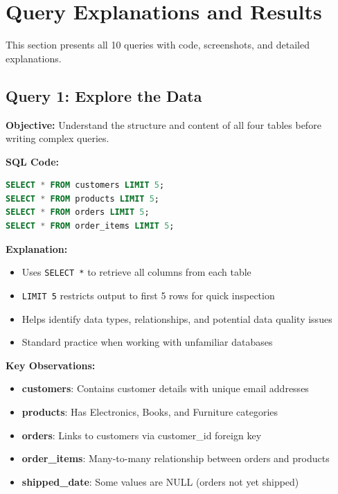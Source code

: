 \documentclass[12pt]{article}
\begin{document}
\newpage

\section{Query Explanations and Results}

This section presents all 10 queries with code, screenshots, and detailed explanations.

\subsection{Query 1: Explore the Data}

\textbf{Objective:} Understand the structure and content of all four tables before writing complex queries.

\textbf{SQL Code:}
\begin{lstlisting}[language=SQL, style=SQL]
SELECT * FROM customers LIMIT 5;
SELECT * FROM products LIMIT 5;
SELECT * FROM orders LIMIT 5;
SELECT * FROM order_items LIMIT 5;
\end{lstlisting}

\textbf{Explanation:}
\begin{itemize}
    \item Uses \texttt{SELECT *} to retrieve all columns from each table
    \item \texttt{LIMIT 5} restricts output to first 5 rows for quick inspection
    \item Helps identify data types, relationships, and potential data quality issues
    \item Standard practice when working with unfamiliar databases
\end{itemize}

\textbf{Key Observations:}
\begin{itemize}
    \item \textbf{customers}: Contains customer details with unique email addresses
    \item \textbf{products}: Has Electronics, Books, and Furniture categories
    \item \textbf{orders}: Links to customers via customer\_id foreign key
    \item \textbf{order\_items}: Many-to-many relationship between orders and products
    \item \textbf{shipped\_date}: Some values are NULL (orders not yet shipped)
\end{itemize}
\end{document}
